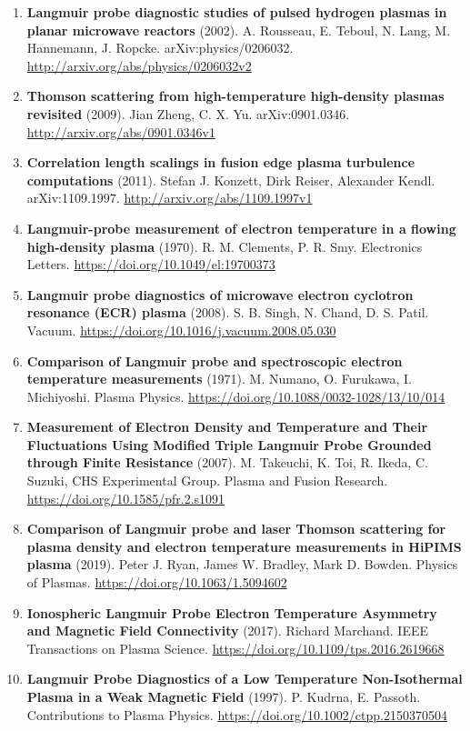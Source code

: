 \documentclass[11pt,a4paper]{article}
\begin{document}
\begin{enumerate}[leftmargin=1.4em]
\item \textbf{Langmuir probe diagnostic studies of pulsed hydrogen plasmas in planar microwave reactors} (2002). A. Rousseau, E. Teboul, N. Lang, M. Hannemann, J. Ropcke. arXiv:physics/0206032. \url{http://arxiv.org/abs/physics/0206032v2}
\item \textbf{Thomson scattering from high-temperature high-density plasmas revisited} (2009). Jian Zheng, C. X. Yu. arXiv:0901.0346. \url{http://arxiv.org/abs/0901.0346v1}
\item \textbf{Correlation length scalings in fusion edge plasma turbulence computations} (2011). Stefan J. Konzett, Dirk Reiser, Alexander Kendl. arXiv:1109.1997. \url{http://arxiv.org/abs/1109.1997v1}
\item \textbf{Langmuir-probe measurement of electron temperature in a flowing high-density plasma} (1970). R. M. Clements, P. R. Smy. Electronics Letters. \url{https://doi.org/10.1049/el:19700373}
\item \textbf{Langmuir probe diagnostics of microwave electron cyclotron resonance (ECR) plasma} (2008). S. B. Singh, N. Chand, D. S. Patil. Vacuum. \url{https://doi.org/10.1016/j.vacuum.2008.05.030}
\item \textbf{Comparison of Langmuir probe and spectroscopic electron temperature measurements} (1971). M. Numano, O. Furukawa, I. Michiyoshi. Plasma Physics. \url{https://doi.org/10.1088/0032-1028/13/10/014}
\item \textbf{Measurement of Electron Density and Temperature and Their Fluctuations Using Modified Triple Langmuir Probe Grounded through Finite Resistance} (2007). M. Takeuchi, K. Toi, R. Ikeda, C. Suzuki, CHS Experimental Group. Plasma and Fusion Research. \url{https://doi.org/10.1585/pfr.2.s1091}
\item \textbf{Comparison of Langmuir probe and laser Thomson scattering for plasma density and electron temperature measurements in HiPIMS plasma} (2019). Peter J. Ryan, James W. Bradley, Mark D. Bowden. Physics of Plasmas. \url{https://doi.org/10.1063/1.5094602}
\item \textbf{Ionospheric Langmuir Probe Electron Temperature Asymmetry and Magnetic Field Connectivity} (2017). Richard Marchand. IEEE Transactions on Plasma Science. \url{https://doi.org/10.1109/tps.2016.2619668}
\item \textbf{Langmuir Probe Diagnostics of a Low Temperature Non-Isothermal Plasma in a Weak Magnetic Field} (1997). P. Kudrna, E. Passoth. Contributions to Plasma Physics. \url{https://doi.org/10.1002/ctpp.2150370504}

\end{enumerate}
\end{document}
